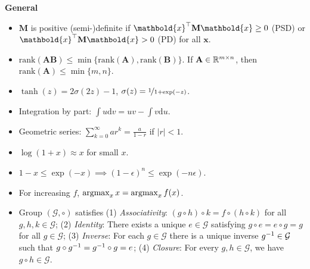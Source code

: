 \documentclass[10pt]{article}
\newenvironment{subtopic}[1]
{\vspace{0.1cm} \begin{center}\textbf{\footnotesize \sffamily #1}\end{center}}
{}
\renewcommand{\mat}[1]{\ensuremath{\mathbf{#1}}}
\renewcommand{\vec}[1]{\ensuremath{\mathbold{#1}}}
\begin{document}
\begin{multicols*}{3}
\begin{subtopic}{General}
\begin{itemize}[left=0pt]
            \item $\mat{M}$ is positive (semi-)definite if $\transpose{\vec{x}} \mat{M} \vec{x} \geq 0$ (PSD) or $\transpose{\vec{x}} \mat{M} \vec{x} > 0$ (PD) for all $\vec{x}$.
            \item $\mathrm{rank}(\mat{A}\mat{B}) \leq \min \{ \mathrm{rank}(\mat{A}), \mathrm{rank}(\mat{B}) \}$. If $\mat{A} \in \R^{m \times n}$, then $\mathrm{rank}(\mat{A}) \leq \min \{ m,n \}$.
            \item $\tanh(z) = 2 \sigma(2z) - 1$, $\sigma(z) = \nicefrac{1}{1+\exp(-z)}$.
            \item Integration by part: $\int u\mathrm{d}v = uv - \int v\mathrm{d}u$.
            \item Geometric series: $\sum_{k=0}^{\infty} ar^k = \frac{a}{1-r}$ if $|r| < 1$.
            \item $\log(1+x) \approx x$ for small $x$.
            \item $1-x \leq \exp(-x) \implies (1-\epsilon)^n \leq \exp(-n \epsilon)$.
            \item For increasing $f$, $\operatorname*{argmax}_{x} x = \operatorname*{argmax}_{x} f(x)$.
            \item Group $(\mathcal{G}, \circ)$ satisfies (1) \textit{Associativity}: $(g \circ h) \circ k = f
                    \circ (h \circ k)$ for all $g,h,k \in \mathcal{G}$; (2) \textit{Identity}: There exists a
                unique $e \in \mathcal{G}$ satisfying $g \circ e = e \circ g = g$ for all $g \in
                    \mathcal{G}$; (3) \textit{Inverse}: For each $g \in \mathcal{G}$ there is a unique inverse
                $g^{-1} \in \mathcal{G}$ such that $g \circ g^{-1}  = g^{-1} \circ g = e$; (4) \textit{Closure}:
                For every $g, h \in \mathcal{G}$, we have $g \circ h \in \mathcal{G}$.
        \end{itemize}
    \end{subtopic}


\end{multicols*}
\end{document}
